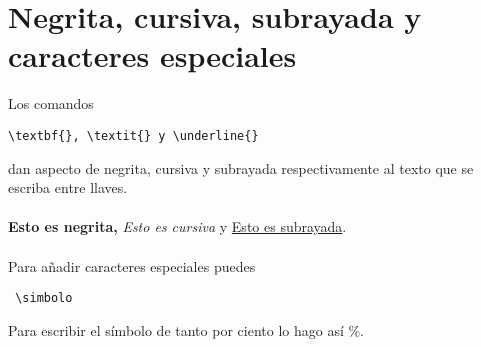 \chapter{Negrita, cursiva, subrayada y caracteres es\textbf{}peciales}
Los comandos \begin{verbatim}\textbf{}, \textit{} y \underline{}\end{verbatim} dan aspecto de negrita, cursiva y subrayada respectivamente al texto que se escriba entre llaves.\\
\\
\textbf{Esto es negrita, }\textit{Esto es cursiva }y \underline{Esto es subrayada}.\\
\\
Para añadir caracteres especiales puedes \begin{verbatim} \simbolo\end{verbatim}
Para escribir el símbolo de tanto por ciento lo hago así \%.